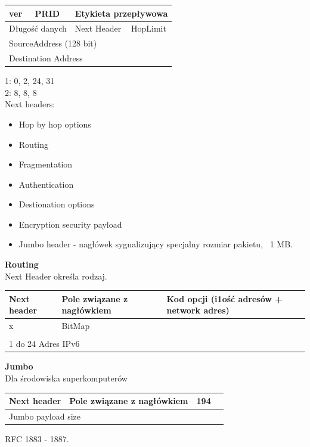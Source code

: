 \documentclass[a4paper,twoside]{article}
\begin{document}
\begin{table}[h]
	\begin{tabular}{|l|l|l|l|l|}
		\hline
		ver       & PRID       & \multicolumn{3}{l|}{Etykieta przepływowa}      \\ \hline
		\multicolumn{3}{|l|}{Długość danych} & Next Header      & HopLimit      \\ \hline
		\multicolumn{5}{|l|}{SourceAddress (128 bit)}                           \\ \hline
		\multicolumn{5}{|l|}{Destination Address}                               \\ \hline
	\end{tabular}
\end{table}
1: 0, 2, 24, 31\\
2: 8, 8, 8\\
Next headers:
\begin{itemize}
	\item Hop by hop options
	\item Routing
	\item Fragmentation
	\item Authentication
	\item Destionation options
	\item Encryption security payload
	\item Jumbo header - nagłówek sygnalizujący specjalny rozmiar pakietu, ~1 MB.
\end{itemize}
\textbf{Routing}\\
Next Header określa rodzaj.\\
\begin{table}[h]
	\begin{tabular}{|l|l|l|l|l|}
		\hline
		Next header & Pole związane z nagłówkiem & \multicolumn{3}{l|}{Kod opcji (i1ość adresów + network adres)} \\ \hline
		x           & \multicolumn{4}{l|}{BitMap}                                                                 \\ \hline
		\multicolumn{5}{|l|}{}                                                                                    \\ \hline
		\multicolumn{5}{|l|}{1 do 24 Adres IPv6}                                                                  \\ \hline
	\end{tabular}
\end{table}

\textbf{Jumbo}\\
Dla środowiska superkomputerów
\begin{table}[h]
	\begin{tabular}{|l|l|l|l|l|}
		\hline
		Next header & Pole związane z nagłówkiem & 194 & \multicolumn{2}{l|}{} \\ \hline
		\multicolumn{5}{|l|}{Jumbo payload size}                               \\ \hline
	\end{tabular}
\end{table}
RFC 1883 - 1887.
\end{document}
